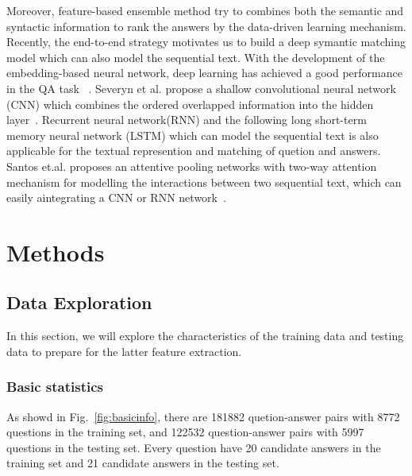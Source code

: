\documentclass{llncs}
\begin{document}
Moreover, feature-based ensemble method \cite{Severyn2013Automatic} try to combines both the semantic and syntactic information to rank the answers by the data-driven learning mechanism. Recently, the end-to-end strategy motivates us to build a deep symantic matching model which can also model the sequential text. With the development of the embedding-based neural network, deep learning has achieved a good performance in the QA task~ \cite{Yu2014Deep} \cite{Feng2015Applying}. Severyn et al. propose a shallow convolutional neural network (CNN) which combines the ordered overlapped information into the hidden layer~\cite{severyn2015learning}. Recurrent neural network(RNN) and the following long short-term memory neural network (LSTM) \cite{Wang2015A} \cite{Tan2015LSTM} which can model the sequential text is also applicable for the textual represention and matching of quetion and answers. Santos et.al. proposes an attentive pooling networks with two-way attention mechanism for modelling the interactions between two sequential text, which can easily aintegrating a CNN or RNN network~\cite{Santos2016Attentive}. 



\section{Methods}
\label{sec:methods}

\subsection{Data Exploration}
\label{sec:exploration}

In this section, we will explore the characteristics of the training data and testing data to {\color{red}prepare} for the latter feature extraction.
\subsubsection{Basic statistics}
As showd in Fig.~\ref{fig:basicinfo}, there are 181882 quetion-answer pairs with 8772 questions in the training set, and 122532 question-answer pairs with 5997 questions in the testing set. Every question have 20 candidate answers in the training set and 21 candidate answers in the testing set.
\end{document}

